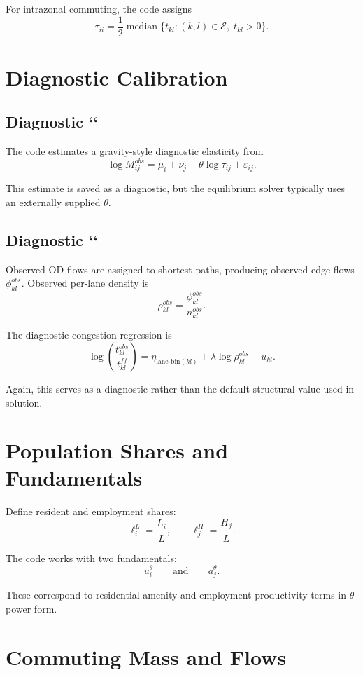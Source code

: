 \documentclass[11pt]{article}
\begin{document}
For intrazonal commuting, the code assigns
\[
\tau_{ii}
=
\frac{1}{2}\operatorname{median}\{ t_{kl} : (k,l)\in \mathcal E,\; t_{kl}>0 \}.
\]

\section{Diagnostic Calibration}

\subsection{Diagnostic `\theta`}

The code estimates a gravity-style diagnostic elasticity from
\[
\log M_{ij}^{obs} = \mu_i + \nu_j - \theta \log \tau_{ij} + \varepsilon_{ij}.
\]

This estimate is saved as a diagnostic, but the equilibrium solver typically uses an externally supplied $\theta$.

\subsection{Diagnostic `\lambda`}

Observed OD flows are assigned to shortest paths, producing observed edge flows $\phi_{kl}^{obs}$.
Observed per-lane density is
\[
\rho_{kl}^{obs} = \frac{\phi_{kl}^{obs}}{n_{kl}^{obs}}.
\]

The diagnostic congestion regression is
\[
\log \left(\frac{t_{kl}^{obs}}{t_{kl}^{ff}}\right)
=
\eta_{\text{lane-bin}(kl)} + \lambda \log \rho_{kl}^{obs} + u_{kl}.
\]

Again, this serves as a diagnostic rather than the default structural value used in solution.

\section{Population Shares and Fundamentals}

Define resident and employment shares:
\[
\ell_i^L = \frac{L_i}{\bar L},
\qquad
\ell_j^H = \frac{H_j}{\bar L}.
\]

The code works with two fundamentals:
\[
\bar u_i^\theta
\qquad\text{and}\qquad
\bar a_j^\theta.
\]

These correspond to residential amenity and employment productivity terms in $\theta$-power form.

\section{Commuting Mass and Flows}
\end{document}
